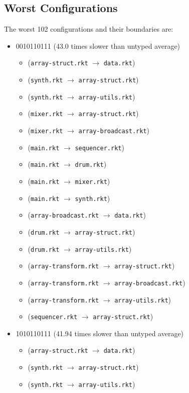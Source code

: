 \documentclass{article}
\newcommand{\mono}[1]{\texttt{#1}}
\begin{document}
\subsection{Worst Configurations}
The worst 102 configurations and their boundaries are:
\begin{itemize}
\item 0010110111 (43.0 times slower than untyped average)
  \begin{itemize}
  \item (\mono{array-struct.rkt} $\rightarrow$ \mono{data.rkt})
  \item (\mono{synth.rkt} $\rightarrow$ \mono{array-struct.rkt})
  \item (\mono{synth.rkt} $\rightarrow$ \mono{array-utils.rkt})
  \item (\mono{mixer.rkt} $\rightarrow$ \mono{array-struct.rkt})
  \item (\mono{mixer.rkt} $\rightarrow$ \mono{array-broadcast.rkt})
  \item (\mono{main.rkt} $\rightarrow$ \mono{sequencer.rkt})
  \item (\mono{main.rkt} $\rightarrow$ \mono{drum.rkt})
  \item (\mono{main.rkt} $\rightarrow$ \mono{mixer.rkt})
  \item (\mono{main.rkt} $\rightarrow$ \mono{synth.rkt})
  \item (\mono{array-broadcast.rkt} $\rightarrow$ \mono{data.rkt})
  \item (\mono{drum.rkt} $\rightarrow$ \mono{array-struct.rkt})
  \item (\mono{drum.rkt} $\rightarrow$ \mono{array-utils.rkt})
  \item (\mono{array-transform.rkt} $\rightarrow$ \mono{array-struct.rkt})
  \item (\mono{array-transform.rkt} $\rightarrow$ \mono{array-broadcast.rkt})
  \item (\mono{array-transform.rkt} $\rightarrow$ \mono{array-utils.rkt})
  \item (\mono{sequencer.rkt} $\rightarrow$ \mono{array-struct.rkt})
  \end{itemize}
\item 1010110111 (41.94 times slower than untyped average)
  \begin{itemize}
  \item (\mono{array-struct.rkt} $\rightarrow$ \mono{data.rkt})
  \item (\mono{synth.rkt} $\rightarrow$ \mono{array-struct.rkt})
  \item (\mono{synth.rkt} $\rightarrow$ \mono{array-utils.rkt})

\end{itemize}
\end{itemize}
\end{document}
